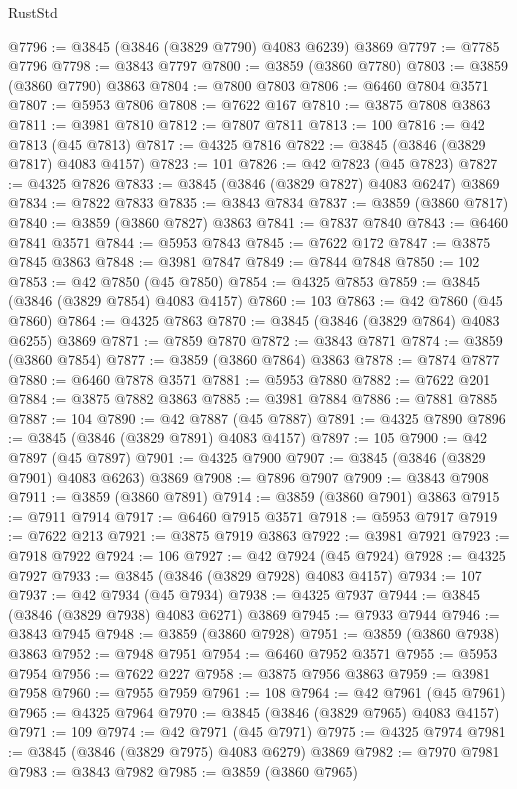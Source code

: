 \begin{lexlean}{RustStd}
\begin{coremodule}
@7796 := @3845 (@3846 (@3829 @7790) @4083 @6239) @3869
@7797 := @7785 @7796
@7798 := @3843 @7797
@7800 := @3859 (@3860 @7780)
@7803 := @3859 (@3860 @7790) @3863
@7804 := @7800 @7803
@7806 := @6460 @7804 @3571
@7807 := @5953 @7806
@7808 := @7622 @167
@7810 := @3875 @7808 @3863
@7811 := @3981 @7810
@7812 := @7807 @7811
@7813 := 100
@7816 := @42 @7813 (@45 @7813)
@7817 := @4325 @7816
@7822 := @3845 (@3846 (@3829 @7817) @4083 @4157)
@7823 := 101
@7826 := @42 @7823 (@45 @7823)
@7827 := @4325 @7826
@7833 := @3845 (@3846 (@3829 @7827) @4083 @6247) @3869
@7834 := @7822 @7833
@7835 := @3843 @7834
@7837 := @3859 (@3860 @7817)
@7840 := @3859 (@3860 @7827) @3863
@7841 := @7837 @7840
@7843 := @6460 @7841 @3571
@7844 := @5953 @7843
@7845 := @7622 @172
@7847 := @3875 @7845 @3863
@7848 := @3981 @7847
@7849 := @7844 @7848
@7850 := 102
@7853 := @42 @7850 (@45 @7850)
@7854 := @4325 @7853
@7859 := @3845 (@3846 (@3829 @7854) @4083 @4157)
@7860 := 103
@7863 := @42 @7860 (@45 @7860)
@7864 := @4325 @7863
@7870 := @3845 (@3846 (@3829 @7864) @4083 @6255) @3869
@7871 := @7859 @7870
@7872 := @3843 @7871
@7874 := @3859 (@3860 @7854)
@7877 := @3859 (@3860 @7864) @3863
@7878 := @7874 @7877
@7880 := @6460 @7878 @3571
@7881 := @5953 @7880
@7882 := @7622 @201
@7884 := @3875 @7882 @3863
@7885 := @3981 @7884
@7886 := @7881 @7885
@7887 := 104
@7890 := @42 @7887 (@45 @7887)
@7891 := @4325 @7890
@7896 := @3845 (@3846 (@3829 @7891) @4083 @4157)
@7897 := 105
@7900 := @42 @7897 (@45 @7897)
@7901 := @4325 @7900
@7907 := @3845 (@3846 (@3829 @7901) @4083 @6263) @3869
@7908 := @7896 @7907
@7909 := @3843 @7908
@7911 := @3859 (@3860 @7891)
@7914 := @3859 (@3860 @7901) @3863
@7915 := @7911 @7914
@7917 := @6460 @7915 @3571
@7918 := @5953 @7917
@7919 := @7622 @213
@7921 := @3875 @7919 @3863
@7922 := @3981 @7921
@7923 := @7918 @7922
@7924 := 106
@7927 := @42 @7924 (@45 @7924)
@7928 := @4325 @7927
@7933 := @3845 (@3846 (@3829 @7928) @4083 @4157)
@7934 := 107
@7937 := @42 @7934 (@45 @7934)
@7938 := @4325 @7937
@7944 := @3845 (@3846 (@3829 @7938) @4083 @6271) @3869
@7945 := @7933 @7944
@7946 := @3843 @7945
@7948 := @3859 (@3860 @7928)
@7951 := @3859 (@3860 @7938) @3863
@7952 := @7948 @7951
@7954 := @6460 @7952 @3571
@7955 := @5953 @7954
@7956 := @7622 @227
@7958 := @3875 @7956 @3863
@7959 := @3981 @7958
@7960 := @7955 @7959
@7961 := 108
@7964 := @42 @7961 (@45 @7961)
@7965 := @4325 @7964
@7970 := @3845 (@3846 (@3829 @7965) @4083 @4157)
@7971 := 109
@7974 := @42 @7971 (@45 @7971)
@7975 := @4325 @7974
@7981 := @3845 (@3846 (@3829 @7975) @4083 @6279) @3869
@7982 := @7970 @7981
@7983 := @3843 @7982
@7985 := @3859 (@3860 @7965)

\end{coremodule}
\end{lexlean}
